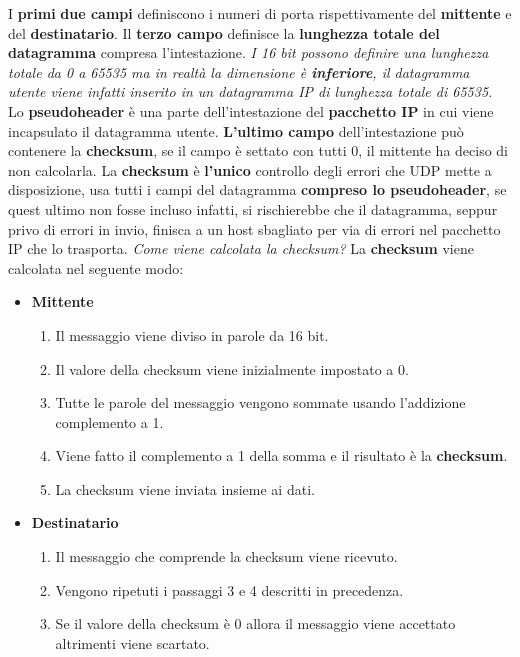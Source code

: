 \documentclass[11pt,a4paper]{article}
\theoremstyle{definition}
\begin{document}
I \textbf{primi} \textbf{due campi} definiscono i numeri di porta rispettivamente del \textbf{mittente} e del \textbf{destinatario}. Il \textbf{terzo campo} definisce la \textbf{lunghezza totale del datagramma} compresa l'intestazione.\textit{ I 16 bit possono definire una lunghezza totale da 0 a 65535 ma in realtà la dimensione è \textbf{inferiore}, il datagramma utente viene infatti inserito in un datagramma IP di lunghezza totale di 65535.} Lo \textbf{pseudoheader} è una parte dell'intestazione del \textbf{pacchetto IP} in cui viene incapsulato il datagramma utente. \textbf{L'ultimo campo} dell'intestazione può contenere la \textbf{checksum}, se il campo è settato con tutti 0, il mittente ha deciso di non calcolarla. La \textbf{checksum} è \textbf{l'unico} controllo degli errori che UDP mette  a disposizione, usa tutti i campi del datagramma \textbf{compreso lo pseudoheader}, se quest ultimo non fosse incluso infatti, si rischierebbe che il datagramma, seppur privo di errori in invio, finisca a un host sbagliato per via di errori nel pacchetto IP che lo trasporta.
\newpage
\textit{Come viene calcolata la checksum?}\newline\newline
La \textbf{checksum} viene calcolata nel seguente modo:
\begin{itemize}
	\item \textbf{Mittente}
	      \begin{enumerate}
		      \item Il messaggio viene diviso in parole da 16 bit.
		      \item Il valore della checksum viene inizialmente impostato a 0.
		      \item Tutte le parole del messaggio vengono sommate usando l'addizione complemento a 1.
		      \item Viene fatto il complemento a 1 della somma e il risultato è la \textbf{checksum}.
		      \item La checksum viene inviata insieme ai dati.
	      \end{enumerate}
	\item \textbf{Destinatario}
	      \begin{enumerate}
		      \item Il messaggio che comprende la checksum viene ricevuto.
		      \item Vengono ripetuti i passaggi 3 e 4 descritti in precedenza.
		      \item Se il valore della checksum è 0 allora il messaggio viene accettato altrimenti viene scartato.
	      \end{enumerate}
\end{itemize}
\end{document}
